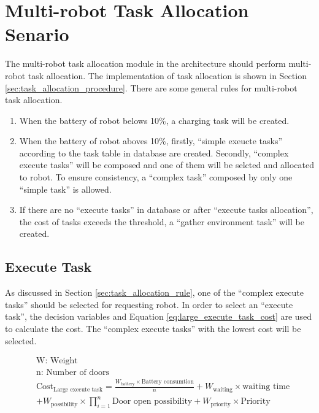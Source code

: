 \section{Multi-robot Task Allocation Senario}
The multi-robot task allocation module in the architecture should perform multi-robot task allocation. 
The implementation of task allocation is shown in Section \ref{sec:task_allocation_procedure}. There are some general rules for multi-robot task allocation.


\begin{enumerate}
	\label{sec:task_allocation_rule}
	\item When the battery of robot belows 10\%, a charging task will be created.
	\item When the battery of robot aboves 10\%, firstly, ``simple exeucte tasks'' according to the task table in database are created. Secondly, ``complex execute tasks'' will be composed and one of them will be selcted and allocated to robot. To ensure consistency, a ``complex task'' composed by only one ``simple task'' is allowed. 
    \item If there are no ``execute tasks'' in database or after ``execute tasks allocation'', the cost of tasks exceeds the threshold, a ``gather environment task'' will be created.
\end{enumerate}

\subsection{Execute Task}
As discussed in Section \ref{sec:task_allocation_rule}, one of the ``complex execute tasks'' should be selected for requesting robot. In order to select an ``execute task'', the decision variables and Equation \ref{eq:large_execute_task_cost} are used to calculate the cost. The ``complex execute tasks'' with the lowest cost will be selected.

\begin{equation}
	\label{eq:large_execute_task_cost} 
	\begin{aligned}
	& \mbox{W: Weight } \\
	& \mbox{n: Number of doors} \\
	& \mbox{Cost}_{\mbox{Large execute task}} = \frac{W_{\mbox{battery}} \times \mbox{Battery consumtion}}{n} + W_{\mbox{waiting}} \times \mbox{waiting time} \\
	& + W_{\mbox{possibility}} \times \prod\limits_{i=1}^n \mbox{Door open possibility}  + W_{\mbox{priority}} \times \mbox{Priority}
	\end{aligned}
\end{equation}

